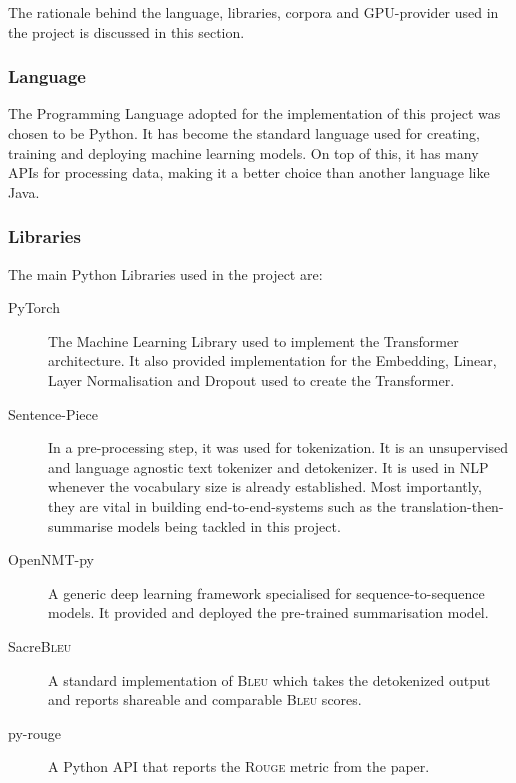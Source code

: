 \documentclass[12pt,a4paper,twoside,openright]{report}
\newcommand{\bleu}{\textsc{Bleu} }
\newcommand{\rouge}{\textsc{Rouge} }
\begin{document}
The rationale behind the language, libraries, corpora and GPU-provider used in the project is discussed in this section.

\subsubsection{Language}
The Programming Language adopted for the implementation of this project was chosen to be Python. It has become the standard language used for creating, training and deploying machine learning models. On top of this, it has many APIs for processing data, making it a better choice than another language like Java.

\subsubsection{Libraries}
The main Python Libraries used in the project are:
\begin{description}
\item[PyTorch\cite{torch}]
The Machine Learning Library used to implement the Transformer architecture. It also provided implementation for the Embedding, Linear, Layer Normalisation and Dropout used to create the Transformer.
\item[Sentence-Piece\cite{sentencepiece}]
In a pre-processing step, it was used for tokenization. It is an unsupervised and language agnostic text tokenizer and detokenizer. It is used in NLP whenever the vocabulary size is already established. Most importantly, they are vital in building end-to-end-systems such as the translation-then-summarise models being tackled in this project.
\item[OpenNMT-py\cite{opennmt}]
A generic deep learning framework specialised for sequence-to-sequence models. It provided and deployed the pre-trained summarisation model.
\item[Sacre\bleu\cite{sacrebleu}]
A standard implementation of \bleu\cite{bleu} which takes the detokenized output and reports shareable and comparable \bleu scores.
\item[py-rouge\cite{py-rouge}]
A Python API that reports the \rouge metric from the paper\cite{rouge}.

\end{description}
\end{document}
